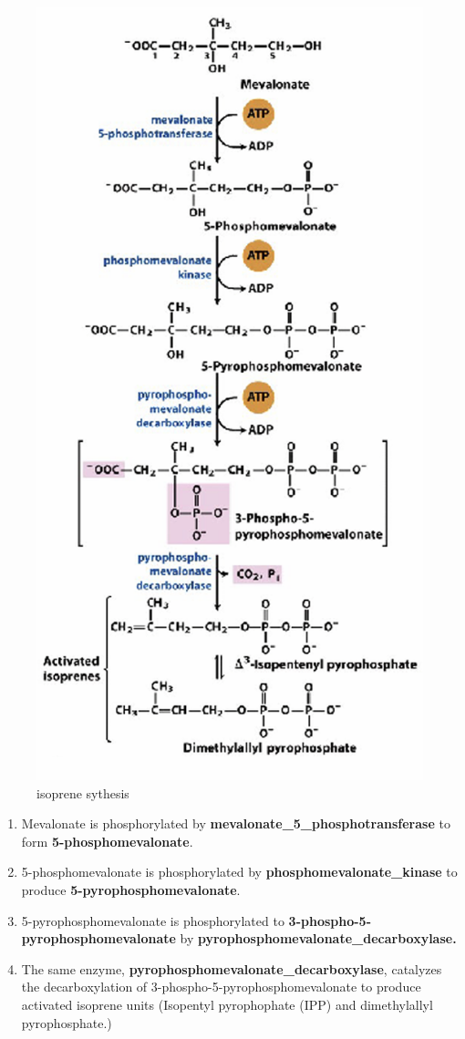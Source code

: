 \documentclass[../main.tex]{subfiles}
\begin{document}
\begin{figure}[H]
    \centering
    \includegraphics[width=0.4\linewidth]{isopreneSythesis.png}
    \caption{isoprene sythesis}
    \label{fig:enter-label}
\end{figure}
\begin{enumerate}
    \item Mevalonate is phosphorylated by \textbf{\gls{mevalonate_5_phosphotransferase} }to form \textbf{5-phosphomevalonate}.
    
    \item 5-phosphomevalonate is phosphorylated by \textbf{\gls{phosphomevalonate_kinase}} to produce \textbf{5-pyrophosphomevalonate}.
    
    \item 5-pyrophosphomevalonate is phosphorylated to \textbf{3-phospho-5-pyrophosphomevalonate} by \textbf{\gls{pyrophosphomevalonate_decarboxylase}.}
    
    \item The same enzyme, \textbf{\gls{pyrophosphomevalonate_decarboxylase}}, catalyzes the decarboxylation of 3-phospho-5-pyrophosphomevalonate to produce activated isoprene units (Isopentyl pyrophophate  (IPP) and dimethylallyl pyrophosphate.)
\end{enumerate}
\end{document}
